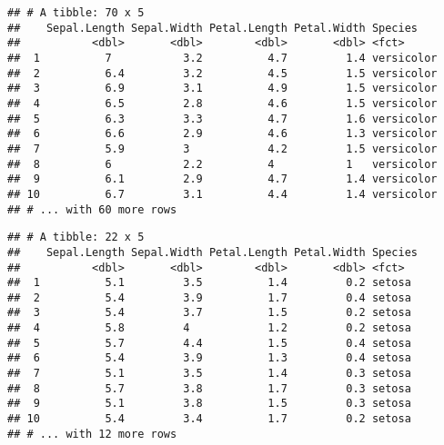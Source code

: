 \documentclass[]{book}
\newenvironment{Shaded}{\begin{snugshade}}{\end{snugshade}}
\newcommand{\KeywordTok}[1]{\textcolor[rgb]{0.13,0.29,0.53}{\textbf{#1}}}
\newcommand{\NormalTok}[1]{#1}
\newcommand{\OperatorTok}[1]{\textcolor[rgb]{0.81,0.36,0.00}{\textbf{#1}}}
\newcommand{\StringTok}[1]{\textcolor[rgb]{0.31,0.60,0.02}{#1}}
\begin{document}
\begin{verbatim}
## # A tibble: 70 x 5
##    Sepal.Length Sepal.Width Petal.Length Petal.Width Species   
##           <dbl>       <dbl>        <dbl>       <dbl> <fct>     
##  1          7           3.2          4.7         1.4 versicolor
##  2          6.4         3.2          4.5         1.5 versicolor
##  3          6.9         3.1          4.9         1.5 versicolor
##  4          6.5         2.8          4.6         1.5 versicolor
##  5          6.3         3.3          4.7         1.6 versicolor
##  6          6.6         2.9          4.6         1.3 versicolor
##  7          5.9         3            4.2         1.5 versicolor
##  8          6           2.2          4           1   versicolor
##  9          6.1         2.9          4.7         1.4 versicolor
## 10          6.7         3.1          4.4         1.4 versicolor
## # ... with 60 more rows
\end{verbatim}

\begin{Shaded}
\end{Shaded}

\begin{verbatim}
## # A tibble: 22 x 5
##    Sepal.Length Sepal.Width Petal.Length Petal.Width Species
##           <dbl>       <dbl>        <dbl>       <dbl> <fct>  
##  1          5.1         3.5          1.4         0.2 setosa 
##  2          5.4         3.9          1.7         0.4 setosa 
##  3          5.4         3.7          1.5         0.2 setosa 
##  4          5.8         4            1.2         0.2 setosa 
##  5          5.7         4.4          1.5         0.4 setosa 
##  6          5.4         3.9          1.3         0.4 setosa 
##  7          5.1         3.5          1.4         0.3 setosa 
##  8          5.7         3.8          1.7         0.3 setosa 
##  9          5.1         3.8          1.5         0.3 setosa 
## 10          5.4         3.4          1.7         0.2 setosa 
## # ... with 12 more rows
\end{verbatim}

\begin{Shaded}
\end{Shaded}
\end{document}
